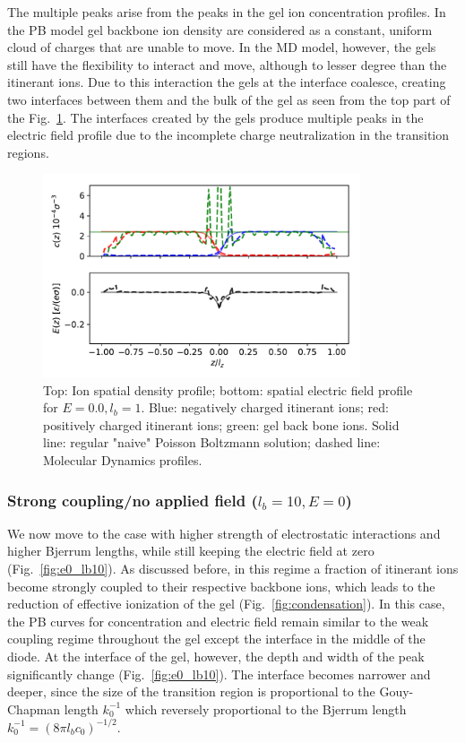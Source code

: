 \documentclass[twoside,twocolumn,9pt]{article}
\begin{document}
The multiple peaks arise from the peaks in the gel ion concentration profiles. In the PB model gel backbone ion density are considered as a constant, uniform cloud of charges that are unable to move. In the MD model, however,  the gels still have the flexibility to interact and move, although to lesser degree than the itinerant ions. Due to this interaction the gels at the interface coalesce, creating two interfaces between them and the bulk of the gel as seen from the top part of the Fig.~\ref{fig:e0_lb1}. The interfaces created by the gels produce multiple peaks in the electric field profile due to the incomplete charge neutralization in the transition regions.
 

\begin{figure}[h]
\centering
  \includegraphics[height=6cm]{fig/Compare_E00_lb1.pdf}
  \caption{Top: Ion spatial density profile; bottom: spatial electric field profile for $E=0.0, l_b=1$. Blue: negatively charged itinerant ions; red: positively charged itinerant ions; green: gel back bone ions. Solid line: regular "naive" Poisson Boltzmann solution; dashed line: Molecular Dynamics profiles.}
  \label{fig:e0_lb1}
\end{figure}

\subsubsection{Strong coupling/no applied field ($l_b=10, E=0$)}
We now move to the case with higher strength of electrostatic interactions and higher Bjerrum lengths, while still keeping the electric field at zero (Fig.~\ref{fig:e0_lb10}). As discussed before, in this regime a fraction of itinerant ions become strongly coupled to their respective backbone ions, which leads to the reduction of effective ionization of the gel (Fig.~\ref{fig:condensation}). In this case, the PB curves for concentration and electric field remain similar to the weak coupling regime throughout the gel except the interface in the middle of the diode. At the interface of the gel, however, the depth and width of the peak significantly change (Fig.~\ref{fig:e0_lb10}). The interface becomes narrower and deeper, since the size of the transition region is proportional to the Gouy-Chapman length $k_0^{-1}$ which reversely proportional to the Bjerrum length $k_0^{-1}=(8 \pi l_b c_0)^{-1/2}$.  
\end{document}
